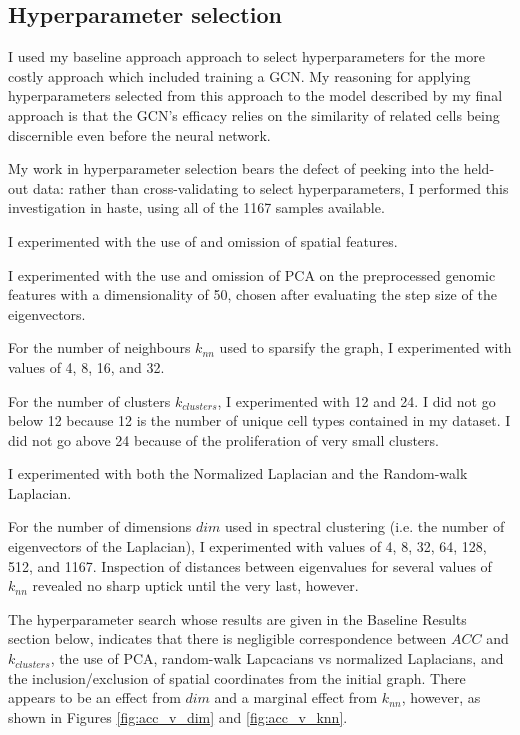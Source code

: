 \documentclass{article}
\newcommand{\nData}{1167}
\begin{document}
\subsection{Hyperparameter selection}

I used my baseline approach approach to select hyperparameters for the more costly approach which included training a GCN. My reasoning for applying hyperparameters selected from this approach to the model described by my final approach is that the GCN's efficacy relies on the similarity of related cells being discernible even before the neural network.

My work in hyperparameter selection bears the defect of peeking into the held-out data: rather than cross-validating to select hyperparameters, I performed this investigation in haste, using all of the \nData{} samples available.

I experimented with the use of and omission of spatial features.

I experimented with the use and omission of PCA on the preprocessed genomic features with a dimensionality of 50, chosen after evaluating the step size of the eigenvectors.

For the number of neighbours $k_{nn}$ used to sparsify the graph, I experimented with values of 4, 8, 16, and 32.

For the number of clusters $k_{clusters}$, I experimented with 12 and 24. I did not go below 12 because 12 is the number of unique cell types contained in my dataset. I did not go above 24 because of the proliferation of very small clusters.

I experimented with both the Normalized Laplacian and the Random-walk Laplacian.

For the number of dimensions $dim$ used in spectral clustering (i.e. the number of eigenvectors of the Laplacian), I experimented with values of 4, 8, 32, 64, 128, 512, and \nData{}. Inspection of distances between eigenvalues for several values of $k_{nn}$ revealed no sharp uptick until the very last, however.

The hyperparameter search whose results are given in the Baseline Results section below, indicates that there is negligible correspondence between $ACC$ and $k_{clusters}$, the use of PCA, random-walk Lapcacians vs normalized Laplacians, and the inclusion/exclusion of spatial coordinates from the initial graph. There appears to be an effect from $dim$ and a marginal effect from $k_{nn}$, however, as shown in Figures \ref{fig:acc_v_dim} and \ref{fig:acc_v_knn}.
\end{document}
